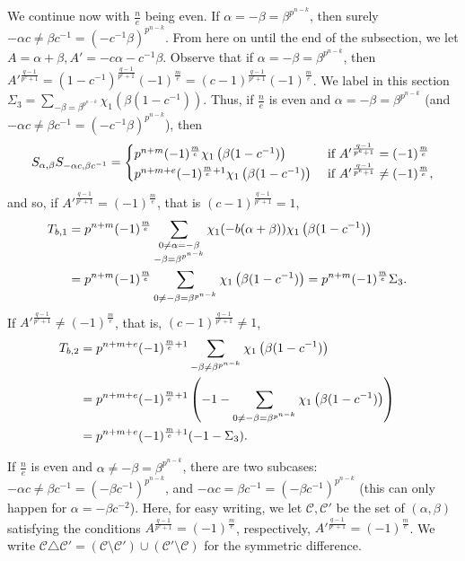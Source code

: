 \documentclass[11pt]{article}
\def\cC{{\mathcal C}}
\def\\{\cr}
\begin{document}
We continue now with $\frac{n}{e}$ being even.
If $\alpha=-\beta=\beta^{p^{n-k}}$, then surely $-\alpha c\neq \beta c^{-1}=(-c^{-1} \beta)^{p^{n-k}}$.  From here on until the end of the subsection, we let $A=\alpha+\beta, A'=-c\alpha-c^{-1}\beta$. Observe that if $\alpha=-\beta=\beta^{p^{n-k}}$, then ${A'}^{\frac{q-1}{p^e+1}}=(1-c^{-1})^{\frac{q-1}{p^e+1}} (-1)^{\frac{m}{e}}=(c-1)^{\frac{q-1}{p^e+1}} (-1)^{\frac{m}{e}}$. We  label in this section $\displaystyle \Sigma_3=\sum_{-\beta=\beta^{p^{n-k}}}  \chi_1\left(\beta(1-c^{-1})\right)$. 
Thus, if $\frac{n}{e}$ is even and $\alpha=-\beta=\beta^{p^{n-k}}$ (and $-\alpha c\neq \beta c^{-1}=(-c^{-1} \beta)^{p^{n-k}}$), then
\[
S_{\alpha,\beta}S_{-\alpha c,\beta c^{-1}} 
=\begin{cases}
p^{n+m}(-1)^{\frac{m}{e}} \chi_1\left(\beta(1-c^{-1})\right) &\text{ if }  {A'}^{\frac{q-1}{p^e+1}}=(-1)^{\frac{m}{e}}\\
p^{n+m+e}(-1)^{\frac{m}{e}+1} \chi_1\left(\beta(1-c^{-1})\right) &\text{ if }  {A'}^{\frac{q-1}{p^e+1}}\neq (-1)^{\frac{m}{e}},
\end{cases}
\] 
and so, if ${A'}^{\frac{q-1}{p^e+1}}=(-1)^{\frac{m}{e}}$, that is $(c-1)^{\frac{q-1}{p^e+1}} =1$,
\allowdisplaybreaks
\begin{align*}
T_{b,1}&=p^{n+m}(-1)^{\frac{m}{e}} \sum_{\substack{0\neq \alpha=-\beta\\
-\beta=\beta^{p^{n-k}}}} \chi_1(-b(\alpha+\beta))  \chi_1\left(\beta(1-c^{-1})\right)  \\
&= p^{n+m}(-1)^{\frac{m}{e}} \sum_{0\neq -\beta=\beta^{p^{n-k}}}  \chi_1\left(\beta(1-c^{-1})\right) =p^{n+m}(-1)^{\frac{m}{e}}  \Sigma_3.
\end{align*}
If ${A'}^{\frac{q-1}{p^e+1}}\neq (-1)^{\frac{m}{e}}$, that is, $(c-1)^{\frac{q-1}{p^e+1}} \neq 1$,  \begin{align*}
T_{b,2}&= p^{n+m+e}(-1)^{\frac{m}{e}+1} \sum_{-\beta\neq \beta^{p^{n-k}}}  \chi_1\left(\beta(1-c^{-1})\right) \\
&=p^{n+m+e}(-1)^{\frac{m}{e}+1}\left(-1-\sum_{0\neq -\beta=\beta^{p^{n-k}}}  \chi_1\left(\beta(1-c^{-1})\right) \right)\\
&=p^{n+m+e}(-1)^{\frac{m}{e}+1}  (-1-\Sigma_3).
\end{align*}

If $\frac{n}{e}$ is even and $\alpha\neq -\beta=\beta^{p^{n-k}}$, there are two subcases: $-\alpha c\neq \beta c^{-1}=(-\beta c^{-1})^{p^{n-k}}$, and $-\alpha c= \beta c^{-1}=(-\beta c^{-1})^{p^{n-k}}$ (this can only happen for $\alpha=-\beta c^{-2}$). Here, for easy writing, we let $\cC,\cC'$ be the set of $(\alpha,\beta)$ satisfying the conditions
$A^{\frac{q-1}{p^e+1}}=(-1)^{\frac{m}{e}}$, respectively, ${A'}^{\frac{q-1}{p^e+1}}=(-1)^{\frac{m}{e}}$.
We write $\cC\triangle\cC'= (\cC\setminus\cC')\cup (\cC'\setminus\cC)$ for the symmetric difference.
\end{document}
